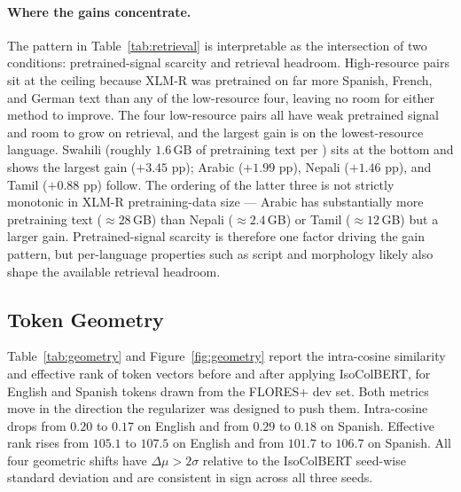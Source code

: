 \paragraph{Where the gains concentrate.} The pattern in Table~\ref{tab:retrieval} is interpretable as the intersection of two conditions: pretrained-signal scarcity and retrieval headroom. High-resource pairs sit at the ceiling because XLM-R was pretrained on far more Spanish, French, and German text than any of the low-resource four, leaving no room for either method to improve. The four low-resource pairs all have weak pretrained signal and room to grow on retrieval, and the largest gain is on the lowest-resource language. Swahili (roughly $1.6$\,GB of pretraining text per \citet{conneau2020xlmr}) sits at the bottom and shows the largest gain ($+3.45$ pp); Arabic ($+1.99$ pp), Nepali ($+1.46$ pp), and Tamil ($+0.88$ pp) follow. The ordering of the latter three is not strictly monotonic in XLM-R pretraining-data size --- Arabic has substantially more pretraining text ($\approx 28$\,GB) than Nepali ($\approx 2.4$\,GB) or Tamil ($\approx 12$\,GB) but a larger gain. Pretrained-signal scarcity is therefore one factor driving the gain pattern, but per-language properties such as script and morphology likely also shape the available retrieval headroom.

\subsection{Token Geometry}
\label{sec:results-geometry}

Table~\ref{tab:geometry} and Figure~\ref{fig:geometry} report the intra-cosine similarity and effective rank of token vectors before and after applying IsoColBERT, for English and Spanish tokens drawn from the FLORES+ dev set. Both metrics move in the direction the regularizer was designed to push them. Intra-cosine drops from $0.20$ to $0.17$ on English and from $0.29$ to $0.18$ on Spanish. Effective rank rises from $105.1$ to $107.5$ on English and from $101.7$ to $106.7$ on Spanish. All four geometric shifts have $\Delta\mu > 2\sigma$ relative to the IsoColBERT seed-wise standard deviation and are consistent in sign across all three seeds.


